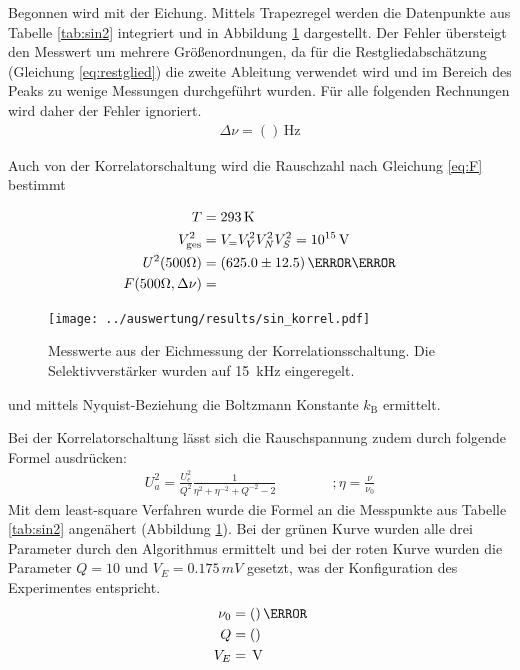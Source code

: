 Begonnen wird mit der Eichung. Mittels Trapezregel werden die Datenpunkte aus Tabelle \ref{tab:sin2} integriert und in Abbildung \ref{fig:eichmessung_korrel} dargestellt. Der Fehler übersteigt den Messwert um mehrere Größenordnungen, da für die Restgliedabschätzung (Gleichung \ref{eq:restglied}) die zweite Ableitung verwendet wird und im Bereich des Peaks zu wenige Messungen durchgeführt wurden. Für alle folgenden Rechnungen wird daher der Fehler ignoriert.
\begin{align}
\Delta\nu= ()\,\si{\hertz}
\end{align}

Auch von der Korrelatorschaltung wird die Rauschzahl nach Gleichung \ref{eq:F} bestimmt

\begin{align*}
T &= \SI{293}{\kelvin}\\
V^2_\text{ges} &= V_=V^2_VV^2_NV_S^2 = 10^{15}\, \si{\volt}\\
U^2(500\Omega) &= (625.0\pm 12.5)\,{\milli\volt}\\
F(500\Omega, \Delta\nu) &= 
\end{align*}

\begin{figure}[htbp]
	\centering
	\texttt{[image: ../auswertung/results/sin\_korrel.pdf]}
	\caption{Messwerte aus der Eichmessung der Korrelationsschaltung. Die Selektivverstärker wurden auf \SI{15}{\kilo\Hz} eingeregelt.}
	\label{fig:eichmessung_korrel}
\end{figure}

und mittels Nyquist-Beziehung die Boltzmann Konstante $k_\text{B}$ ermittelt.

Bei der Korrelatorschaltung lässt sich die Rauschspannung zudem durch folgende Formel ausdrücken:
\begin{align}
	U^2_a = \frac{U_e^2}{Q^2}\frac{1}{\eta^2 + \eta^{-2} + Q^{-2} -2} \qquad \qquad ;\eta = \frac{\nu}{\nu_0}
\end{align}
Mit dem least-square Verfahren wurde die Formel an die Messpunkte aus Tabelle \ref{tab:sin2} angenähert (Abbildung \ref{fig:eichmessung_korrel}). Bei der grünen Kurve wurden alle drei Parameter durch den Algorithmus ermittelt und bei der roten Kurve wurden die Parameter $Q=10$ und $V_E=0.175\,\si{mV}$ gesetzt, was der Konfiguration des Experimentes entspricht.
\begin{align}
	\nu_0 &= () \,\hertz\\
	Q &= ()\\
	V_E &= \, \si{\volt}
\end{align}

